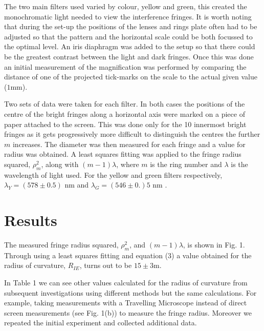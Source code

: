 \documentclass[twocolumn]{revtex4}
\newcommand{\squeezeup}{\vspace{-2.5mm}}
\begin{document}
\squeezeup
\squeezeup

The two main filters used varied by colour, yellow and green, this created the monochromatic light needed to view the interference fringes. It is worth noting that during the set-up the positions of the lenses and rings plate often had to be adjusted so that the pattern and the horizontal scale could be both focussed to the optimal level. An iris diaphragm was added to the setup so that there could be the greatest contrast between the light and dark fringes. Once this was done an initial measurement of the magnification was performed by comparing the distance of one of the projected tick-marks on the scale to the actual given value ($1$mm). 

Two sets of data were taken for each filter. In both cases the positions of the centre of the bright fringes along a horizontal axis were marked on a piece of paper attached to the screen. This was done only for the 10 innermost bright fringes as it gets progressively more difficult to distinguish the centres the further $m$ increases. The diameter was then measured for each fringe and a value for radius was obtained. A least squares fitting was applied to the fringe radius squared, $\rho_m^2$, along with $(m-1)\lambda$, where $m$ is the ring number and $\lambda$ is the wavelength of light used. For the yellow and green filters respectively, $\lambda_Y = (578\pm0.5)$ nm and $\lambda_G = (546 \pm 0.)5$ nm \cite{labscript}.

\vspace{-3ex}
\section{Results}
\vspace{-2ex}

The measured fringe radius squared, $\rho_m^2$, and $(m-1)\lambda$, is shown in Fig. 1. Through using a least squares fitting and equation (3) a value obtained for the radius of curvature, $R_{IE}$, turns out to be $15\pm3$m. 

In Table 1 we can see other values calculated for the radius of curvature from subsequent investigations using different methods but the same calculations. For example, taking measurements with a Travelling Microscope instead of direct screen measurements (see Fig. 1(b)) to measure the fringe radius. Moreover we repeated the initial experiment and collected additional data.  
\end{document}
